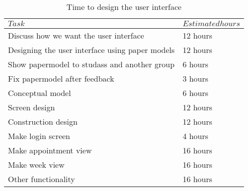\documentclass[a4paper, english, 12pt]{article}
\begin{document}
\begin{table}[h]
    \begin{center}
    \caption{Time to design the user interface} 
    \label{UI}
    \vspace{0,5cm}
    \begin{tabular}{ll} \\ 
        \hline
        $Task$ & $Estimated hours$\\
        \hline 
    Discuss how we want the user interface & 12 hours\\
    Designing the user interface using paper models & 12 hours\\    
    Show papermodel to studass and another group & 6 hours\\
    Fix papermodel after feedback & 3 hours\\
    Conceptual model & 6 hours\\
    Screen design & 12 hours\\
    Construction design & 12 hours\\
    Make login screen & 4 hours\\
    Make appointment view & 16 hours\\
    Make week view & 16 hours\\
    Other functionality & 16 hours\\
        \hline
    \end{tabular}
    \end{center}
\end{table}
\end{document}
